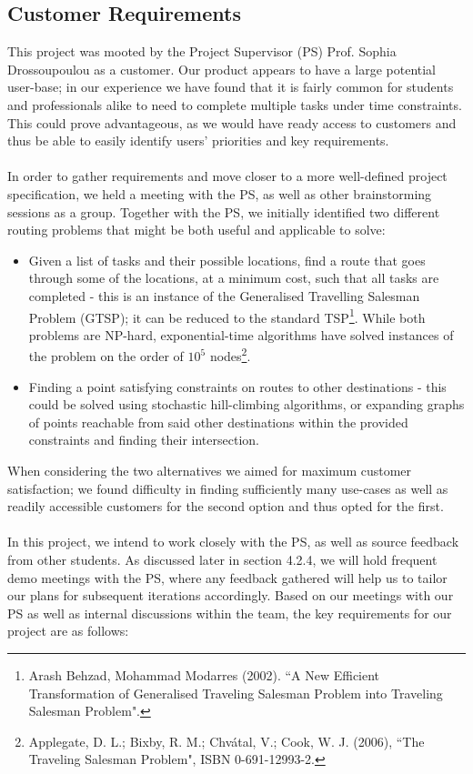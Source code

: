 \documentclass[10pt]{article}
\begin{document}
\subsection{Customer Requirements}
This project was mooted by the Project Supervisor (PS) Prof. Sophia Drossoupoulou as a customer. Our product appears to have a large potential user-base; in our experience we have found that it is fairly common for students and professionals alike to need to complete multiple tasks under time constraints. This could prove advantageous, as we would have ready access to customers and thus be able to easily identify users' priorities and key requirements.\\\\
In order to gather requirements and move closer to a more well-defined project specification, we held a meeting with the PS, as well as other brainstorming sessions as a group. Together with the PS, we initially identified two different routing problems that might be both useful and applicable to solve:
\begin{itemize}
\item Given a list of tasks and their possible locations, find a route that goes through some of the locations, at a minimum cost, such that all tasks are completed - this is an instance of the Generalised Travelling Salesman Problem (GTSP); it can be reduced to the standard TSP\footnote{Arash Behzad, Mohammad Modarres (2002). ``A New Efficient Transformation of Generalised Traveling Salesman Problem into Traveling Salesman Problem".}. While both problems are NP-hard, exponential-time algorithms have solved instances of the problem on the order of $10^5$ nodes\footnote{Applegate, D. L.; Bixby, R. M.; Chvátal, V.; Cook, W. J. (2006), ``The Traveling Salesman Problem", ISBN 0-691-12993-2.}.
\item Finding a point satisfying constraints on routes to other destinations - this could be solved using stochastic hill-climbing algorithms, or expanding graphs of points reachable from said other destinations within the provided constraints and finding their intersection.
\end{itemize}
When considering the two alternatives we aimed for maximum customer satisfaction; we found difficulty in finding sufficiently many use-cases as well as readily accessible customers for the second option and thus opted for the first. \\\\
In this project, we intend to work closely with the PS, as well as source feedback from other students. As discussed later in section 4.2.4, we will hold frequent demo meetings with the PS, where any feedback gathered will help us to tailor our plans for subsequent iterations accordingly. Based on our meetings with our PS as well as internal discussions within the team, the key requirements for our project are as follows:
\end{document}
